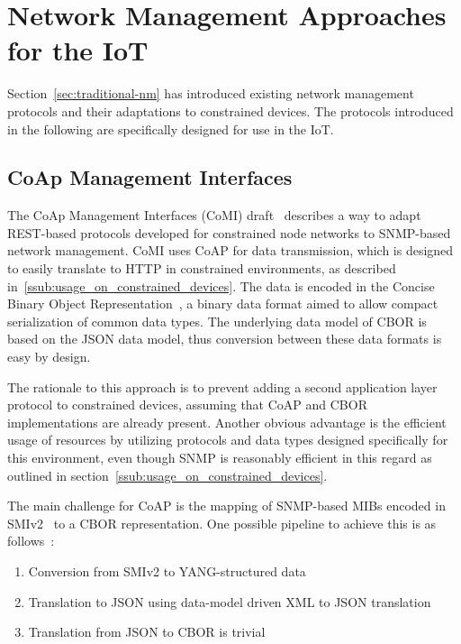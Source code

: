 \documentclass[conference]{IEEEtran}
\begin{document}
\section{Network Management Approaches for the IoT} %
\label{sec:network_management_approaches_for_the_iot}
Section~\ref{sec:traditional-nm} has introduced existing network management protocols and their adaptations to constrained devices. The protocols introduced in the following are specifically designed for use in the IoT.
\subsection{CoAp Management Interfaces} %
\label{sub:comi}
The CoAp Management Interfaces (CoMI) draft~\cite{draft-vanderstok-core-comi-04} describes a way to adapt REST-based protocols developed for constrained node networks to SNMP-based network management.
CoMI uses CoAP for data transmission, which is designed to easily translate to HTTP in constrained environments, as described in~\ref{ssub:usage_on_constrained_devices}. The data is encoded in the Concise Binary Object Representation~\cite{rfc7049}, a binary data format aimed to allow compact serialization of common data types. The underlying data model of CBOR is based on the JSON data model, thus conversion between these data formats is easy by design. 

The rationale to this approach is to prevent adding a second application layer protocol to constrained devices, assuming that CoAP and CBOR implementations are already present. Another obvious advantage is the efficient usage of resources by utilizing protocols and data types designed specifically for this environment, even though SNMP is reasonably efficient in this regard as outlined in section~\ref{ssub:usage_on_constrained_devices}.

The main challenge for CoAP is the mapping of SNMP-based MIBs encoded in SMIv2~\cite{rfc2578} to a CBOR representation. One possible pipeline to achieve this is as follows~\cite{Bergmann}:

\begin{enumerate}
  \item Conversion from SMIv2 to YANG-structured data
  \item Translation to JSON using data-model driven XML to JSON translation~\cite{rfc6110}
  \item Translation from JSON to CBOR is trivial
\end{enumerate}
\end{document}
